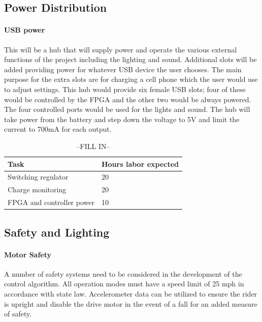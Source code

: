 \documentclass[12pt,article]{IEEEtran}
\begin{document}
    \subsection{Power Distribution}
        \paragraph{USB power}
        	This will be a hub that will supply power and operate the various external functions of the 
        	project including the lighting and sound. Additional slots will be added providing power for 
        	whatever USB device the user chooses.  The main purpose for the extra slots are for charging a 
        	cell phone which the user would use to adjust settings. This hub would provide six female USB 
        	slots; four of these would be controlled by the FPGA and the other two would be always powered.
        	The four controlled ports would be used for the lights and sound. The hub will take power from 
        	the battery and step down the voltage to 5V and limit the current to 700mA for each output.

        \begin{table}[H]        
            \renewcommand{\arraystretch}{1.3}
        		\caption{--FILL IN--}
    			
    			\label{Estimated Time}
    			
    			\centering
    			\begin{tabular}{p{6cm}|p{1.6cm}}
    			\hline
    			\bfseries 	Task 			        	& \bfseries Hours labor expected     		   \\
    			\hline\hline
    						Switching regulator 		& 20						    	            \\
    						Charge monitoring         	& 20			                                \\	
    						FPGA and controller power	& 10				                            \\	
    				        \hline	
    			\end{tabular}
		\end{table}
        
    \subsection{Safety and Lighting}
        \paragraph{Motor Safety}
        	A number of safety systems need to be considered in the development of the control algorithm. All 
        	operation modes must have a speed limit of 25 mph in accordance with state law. Accelerometer data 
        	can be utilized to ensure the rider is upright and disable the drive motor in the event of a fall 
        	for an added measure of safety.	
    
\end{document}
